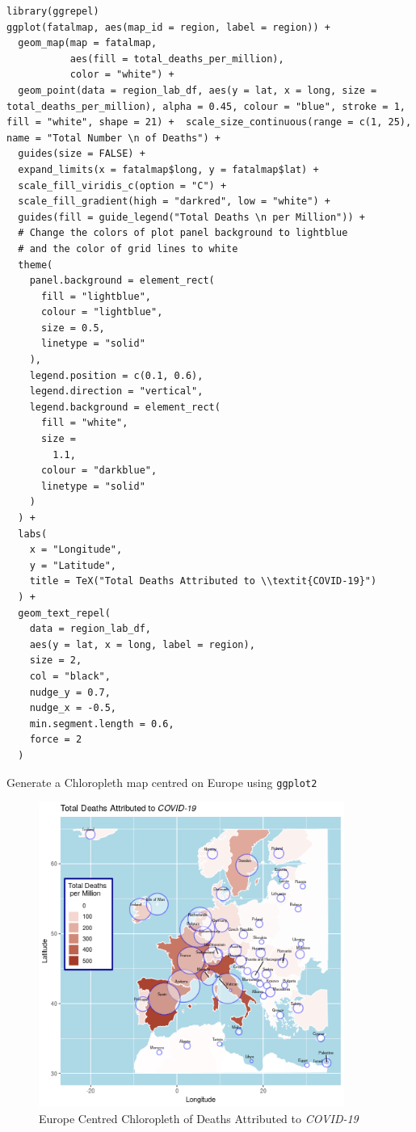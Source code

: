 \documentclass[11pt]{article}
\begin{document}
\begin{listing}[htbp]
\begin{verbatim}
library(ggrepel)
ggplot(fatalmap, aes(map_id = region, label = region)) +
  geom_map(map = fatalmap,
           aes(fill = total_deaths_per_million),
           color = "white") +
  geom_point(data = region_lab_df, aes(y = lat, x = long, size = total_deaths_per_million), alpha = 0.45, colour = "blue", stroke = 1, fill = "white", shape = 21) +  scale_size_continuous(range = c(1, 25), name = "Total Number \n of Deaths") +
  guides(size = FALSE) +
  expand_limits(x = fatalmap$long, y = fatalmap$lat) +
  scale_fill_viridis_c(option = "C") +
  scale_fill_gradient(high = "darkred", low = "white") +
  guides(fill = guide_legend("Total Deaths \n per Million")) +
  # Change the colors of plot panel background to lightblue
  # and the color of grid lines to white
  theme(
    panel.background = element_rect(
      fill = "lightblue",
      colour = "lightblue",
      size = 0.5,
      linetype = "solid"
    ),
    legend.position = c(0.1, 0.6),
    legend.direction = "vertical",
    legend.background = element_rect(
      fill = "white",
      size =
        1.1,
      colour = "darkblue",
      linetype = "solid"
    )
  ) +
  labs(
    x = "Longitude",
    y = "Latitude",
    title = TeX("Total Deaths Attributed to \\textit{COVID-19}")
  ) +
  geom_text_repel(
    data = region_lab_df,
    aes(y = lat, x = long, label = region),
    size = 2,
    col = "black",
    nudge_y = 0.7,
    nudge_x = -0.5,
    min.segment.length = 0.6,
    force = 2
  )
\end{verbatim}
\caption{\label{org8902b95}Generate a Chloropleth map centred on Europe using \texttt{ggplot2}}
\end{listing}


\begin{figure}[htbp]
\centering
\includegraphics[width=10cm]{SecChEur.png}
\caption{\label{fig:org223d165}Europe Centred Chloropleth of Deaths Attributed to \emph{COVID-19}}
\end{figure}
\end{document}
